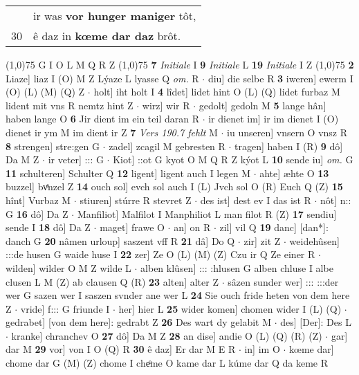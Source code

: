 \documentclass[8pt,a4paper,notitlepage]{article}
\begin{document}
\begin{table}[ht]
\begin{minipage}[t]{0.5\linewidth}
\begin{tabular}{rl}
 & ir was \textbf{vor hunger maniger} tôt,\\ 
30 & ê daz in \textbf{kœme dar daz} brôt.\\ 
\end{tabular}
\scriptsize
\line(1,0){75} \newline
G I O L M Q R Z \newline
\line(1,0){75} \newline
\textbf{7} \textit{Initiale} I  \textbf{9} \textit{Initiale} L  \textbf{19} \textit{Initiale} I Z  \newline
\line(1,0){75} \newline
\textbf{2} Liaze] liaz I (O) M Z Lýaze L lyasse Q \textit{om.} R  $\cdot$ diu] die selbe R \textbf{3} iweren] ewerm I (O) (L) (M) (Q) Z  $\cdot$ holt] iht holt I \textbf{4} lîdet] lidet hint O (L) (Q) lidet furbaz M lident mit vns R nemtz hint Z  $\cdot$ wirz] wir R  $\cdot$ gedolt] gedoln M \textbf{5} lange hân] haben lange O \textbf{6} Jir dient im ein teil daran R  $\cdot$ ir dienet im] ir im dienet I (O) dienet ir ym M im dient ir Z \textbf{7} \textit{Vers 190.7 fehlt} M   $\cdot$ iu unseren] vnsern O vnsz R \textbf{8} strengen] stre:gen G  $\cdot$ zadel] zcagil M gebresten R  $\cdot$ tragen] haben I (R) \textbf{9} dô] Da M Z  $\cdot$ ir veter] ::: G  $\cdot$ Kiot] ::ot G kyot O M Q R Z kýot L \textbf{10} sende iu] \textit{om.} G \textbf{11} schulteren] Schulter Q \textbf{12} ligent] ligent auch I legen M  $\cdot$ ahte] æhte O \textbf{13} buzzel] bvͤnzel Z \textbf{14} ouch sol] evch sol auch I (L) Jvch sol O (R) Euch Q (Z) \textbf{15} hînt] Vurbaz M  $\cdot$ stiuren] stúrre R stevret Z  $\cdot$ des ist] dest ev I das ist R  $\cdot$ nôt] n:: G \textbf{16} dô] Da Z  $\cdot$ Manfiliot] Malfilot I Manphiliot L man filot R (Z) \textbf{17} sendiu] sende I \textbf{18} dô] Da Z  $\cdot$ maget] frawe O  $\cdot$ an] on R  $\cdot$ zil] vil Q \textbf{19} danc] [dan*]: danch G \textbf{20} nâmen urloup] saszent vff R \textbf{21} dâ] Do Q  $\cdot$ zir] zit Z  $\cdot$ weidehûsen] :::de husen G waide huse I \textbf{22} zer] Ze O (L) (M) (Z) Czu ir Q Ze einer R  $\cdot$ wilden] wilder O M Z wilde L  $\cdot$ alben klûsen] ::: :hlusen G alben chluse I albe clusen L M (Z) ab clausen Q (R) \textbf{23} alten] alter Z  $\cdot$ sâzen sunder wer] ::: :::der wer G sazen wer I saszen svnder ane wer L \textbf{24} Sie ouch fride heten von dem here Z  $\cdot$ vride] f::: G friunde I  $\cdot$ her] hier L \textbf{25} wider komen] chomen wider I (L) (Q)  $\cdot$ gedrabet] [von dem here]: gedrabt Z \textbf{26} Des wart dy gelabit M  $\cdot$ des] [Der]: Des L  $\cdot$ kranke] chranchev O \textbf{27} dô] Da M Z \textbf{28} an dise] andie O (L) (Q) (R) (Z)  $\cdot$ gar] dar M \textbf{29} vor] von I O (Q) R \textbf{30} ê daz] Er dar M E R  $\cdot$ in] im O  $\cdot$ kœme dar] chome dar G (M) (Z) chome I cheͦme O kame dar L kúme dar Q da keme R \newline

\end{minipage}
\end{table}
\end{document}
